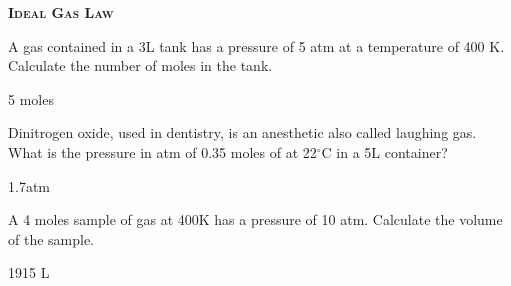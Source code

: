 \documentclass[main.tex]{subfiles}
\begin{document}
\begin{multicols*}{2}
{\raggedright\textsc{\textbf{Ideal Gas Law }}\par}


\begin{question}[ID=\the\value{numA}]
A gas contained in a 3L tank has a pressure of 5 atm at a temperature of 400 K.  Calculate the number of moles in the tank.
\end{question}
\begin{solution}
5 moles
\hspace{0.1cm}\end{solution}%


\begin{question}[ID=\the\value{numA}]
Dinitrogen oxide, used in dentistry, is an anesthetic also called laughing gas. What is the pressure in atm of 0.35 moles of  at 22$^{\circ}$C in a 5L container?
\end{question}
\begin{solution}
1.7atm
\hspace{0.1cm}\end{solution}%


\begin{question}[ID=\the\value{numA}]
A 4 moles sample of gas at 400K has a pressure of 10 atm. Calculate the volume of the sample.
\end{question}
\begin{solution}
1915 L
\hspace{0.1cm}\end{solution}%


\end{multicols*}
\end{document}
